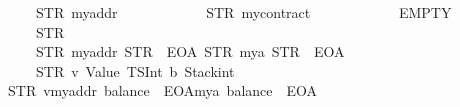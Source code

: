 \begin{isabellebody}
\ \ \ \ \ \ \ \ \ \ \ \ {\isacharparenleft}{\kern0pt}STR\ {\isacharprime}{\kern0pt}{\isacharprime}{\kern0pt}myaddr{\isacharprime}{\kern0pt}{\isacharprime}{\kern0pt}{\isacharparenright}{\kern0pt}\isanewline
\ \ \ \ \ \ \ \ \ \ \ \ {\isacharparenleft}{\kern0pt}STR\ {\isacharprime}{\kern0pt}{\isacharprime}{\kern0pt}mycontract{\isacharprime}{\kern0pt}{\isacharprime}{\kern0pt}{\isacharparenright}{\kern0pt}\isanewline
\ \ \ \ \ \ \ \ \ \ \ \ EMPTY\isanewline
\ \ \ \ \ \ \ \ \ \ \ \ {\isacharparenleft}{\kern0pt}STR\ {\isacharprime}{\kern0pt}{\isacharprime}{\kern0pt}{}{\isacharprime}{\kern0pt}{\isacharprime}{\kern0pt}{\isacharparenright}{\kern0pt}\isanewline
\ \ \ \ \ \ \ \ \ \ \ \ {\isacharbrackleft}{\kern0pt}{\isacharparenleft}{\kern0pt}STR\ {\isacharprime}{\kern0pt}{\isacharprime}{\kern0pt}myaddr{\isacharprime}{\kern0pt}{\isacharprime}{\kern0pt}{\isacharcomma}{\kern0pt}\ STR\ {\isacharprime}{\kern0pt}{\isacharprime}{\kern0pt}{}{}{}{\isacharprime}{\kern0pt}{\isacharprime}{\kern0pt}{\isacharcomma}{\kern0pt}\ EOA{\isacharcomma}{\kern0pt}\ {}{\isacharparenright}{\kern0pt}{\isacharcomma}{\kern0pt}{\isacharparenleft}{\kern0pt}STR\ {\isacharprime}{\kern0pt}{\isacharprime}{\kern0pt}mya{\isacharprime}{\kern0pt}{\isacharprime}{\kern0pt}{\isacharcomma}{\kern0pt}\ STR\ {\isacharprime}{\kern0pt}{\isacharprime}{\kern0pt}{}{}{}{\isacharprime}{\kern0pt}{\isacharprime}{\kern0pt}{\isacharcomma}{\kern0pt}\ EOA{\isacharcomma}{\kern0pt}\ {}{\isacharparenright}{\kern0pt}{\isacharbrackright}{\kern0pt}\isanewline
\ \ \ \ \ \ \ \ \ \ \ \ {\isacharbrackleft}{\kern0pt}{\isacharparenleft}{\kern0pt}STR\ {\isacharprime}{\kern0pt}{\isacharprime}{\kern0pt}v{}{\isacharprime}{\kern0pt}{\isacharprime}{\kern0pt}{\isacharcomma}{\kern0pt}\ {\isacharparenleft}{\kern0pt}Value\ {\isacharparenleft}{\kern0pt}TSInt\ b{}{\isacharparenright}{\kern0pt}{\isacharcomma}{\kern0pt}\ Stackint\ {}{\isacharparenright}{\kern0pt}{\isacharparenright}{\kern0pt}{\isacharbrackright}{\kern0pt}\isanewline
\ \ \ \ \ \ \ {\isacharequal}{\kern0pt}\ STR\ {\isacharprime}{\kern0pt}{\isacharprime}{\kern0pt}v{}{\isacharequal}{\kern0pt}{\isacharequal}{\kern0pt}{}{\isasymnewline}myaddr{\isacharcolon}{\kern0pt}\ balance{\isacharequal}{\kern0pt}{\isacharequal}{\kern0pt}{}{}{}\ {\isacharminus}{\kern0pt}\ EOA{\isasymnewline}mya{\isacharcolon}{\kern0pt}\ balance{\isacharequal}{\kern0pt}{\isacharequal}{\kern0pt}{}{}{}\ {\isacharminus}{\kern0pt}\ EOA{\isacharprime}{\kern0pt}{\isacharprime}{\kern0pt}{\isachardoublequoteclose}\isanewline

\end{isabellebody}
